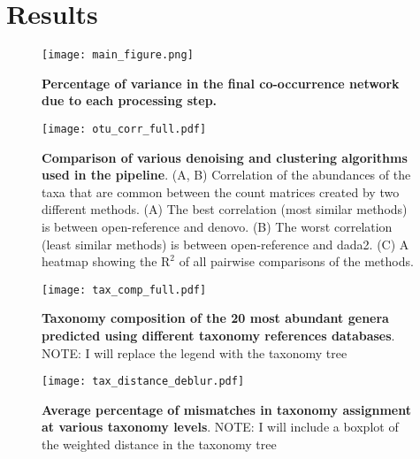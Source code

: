 
\section*{Results}

  \begin{figure}[h]
    \begin{center}
      \texttt{[image: main\_figure.png]}
      \caption{\textbf{Percentage of variance in the final co-occurrence network due to each processing step.} }
      \label{fig:variance}
    \end{center}
  \end{figure}

  \begin{figure}[h]
    \begin{center}
      \texttt{[image: otu\_corr\_full.pdf]}
      \caption{
        \textbf{Comparison of various denoising and clustering algorithms used in the pipeline}.
        (A, B) Correlation of the abundances of the taxa that are common between the count matrices created by two different methods.
        (A) The best correlation (most similar methods) is between open-reference and denovo.
        (B) The worst correlation (least similar methods) is between open-reference and dada2.
        (C) A heatmap showing the $\mathrm{R}^2$ of all pairwise comparisons of the methods.
      }
      \label{fig:otu_correlations}
    \end{center}
  \end{figure}

  \begin{figure}[h]
    \begin{center}
      \texttt{[image: tax\_comp\_full.pdf]}
      \caption{\textbf{Taxonomy composition of the 20 most abundant genera predicted using different taxonomy references databases}. NOTE: I will replace the legend with the taxonomy tree}
      \label{fig:tax_comp}
    \end{center}
  \end{figure}

  \begin{figure}[h]
    \begin{center}
      \texttt{[image: tax\_distance\_deblur.pdf]}
      \caption{\textbf{Average percentage of mismatches in taxonomy assignment at various taxonomy levels}. NOTE: I will include a boxplot of the weighted distance in the taxonomy tree}
      \label{fig:otu_correlations}
    \end{center}
  \end{figure}


